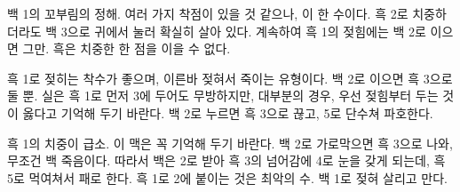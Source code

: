 \documentclass[12pt,b5paper]{article}
\begin{document}
\begin{exercise}
\end{exercise}

\begin{answer}
\begin{solutiontext}
\step 백 1의 꼬부림의 정해. 여러 가지 착점이 있을 것 같으나,
이 한 수이다. 흑 2로 치중하더라도 백 3으로 귀에서 눌러 확실히 살아
있다.
\step 계속하여 흑 1의 젖힘에는 백 2로 이으면 그만.
흑은 치중한 한 점을 이을 수 없다.
\end{solutiontext}
\begin{solutionfigure}
\stepgoban
{}
\stepgoban
\end{solutionfigure}
\end{answer}


\begin{exercise}
\end{exercise}

\begin{answer}
\begin{solutiontext}
\step 흑 1로 젖히는 착수가 좋으며, 이른바 젖혀서 죽이는
유형이다. 백 2로 이으면 흑 3으로 둘 뿐. 실은 흑 1로 먼저 3에 두어도
무방하지만, 대부분의 경우, 우선 젖힘부터 두는 것이 옳다고 기억해
두기 바란다.
\step 백 2로 누르면 흑 3으로 끊고, 5로 단수쳐 파호한다.
\end{solutiontext}
\begin{solutionfigure}
\stepgoban
{}
\stepgoban
\end{solutionfigure}
\end{answer}


\begin{exercise}
\end{exercise}

\begin{answer}
\begin{solutiontext}
\step 흑 1의 치중이 급소. 이 맥은 꼭 기억해 두기 바란다. 
백 2로 가로막으면 흑 3으로 나와, 무조건 백 죽음이다.
\step 따라서 백은 2로 받아 흑 3의 넘어감에 4로 눈을 갖게
되는데, 흑 5로 먹여쳐서 패로 한다. 흑 1로 2에 붙이는 것은
최악의 수. 백 1로 젖혀 살리고 만다.
\end{solutiontext}
\begin{solutionfigure}
\stepgoban
{}
\stepgoban
\end{solutionfigure}
\end{answer}
\end{document}
